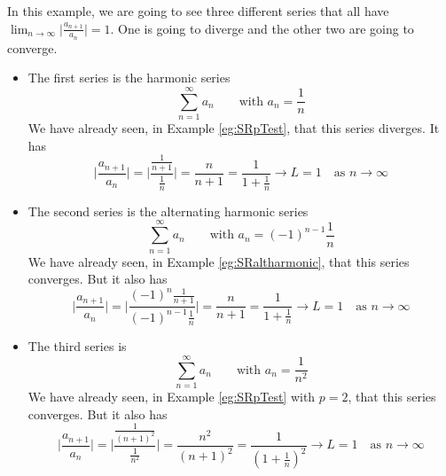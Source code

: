 \begin{eg}[$L=1$]\label{eg:SRratioC}
In this example, we are going to see three different series that all have
$\lim_{n\rightarrow\infty}\Big|\frac{a_{n+1}}{a_n}\Big| = 1$. One
is going to diverge and the other two are going to converge.

\begin{itemize}
\item
The first series is the harmonic series
\begin{equation*}
\sum_{n=1}^\infty a_n\qquad\text{with }a_n = \frac{1}{n}
\end{equation*}
We have already seen, in Example \ref{eg:SRpTest}, that this series diverges.
It has
\begin{equation*}
\Big|\frac{a_{n+1}}{a_n}\Big|
= \bigg|\frac{\frac{1}{n+1}}{\frac{1}{n}}\bigg|
 = \frac{n}{n+1}
 = \frac{1}{1+\frac{1}{n}}
\rightarrow L=1\quad\text{as $n\rightarrow\infty$}
\end{equation*}

\item
The second series is the alternating harmonic series
\begin{equation*}
\sum_{n=1}^\infty a_n\qquad\text{with }a_n = (-1)^{n-1}\frac{1}{n}
\end{equation*}
We have already seen, in Example \ref{eg:SRaltharmonic}, that this series converges.
But it also has
\begin{equation*}
\Big|\frac{a_{n+1}}{a_n}\Big|
= \bigg|\frac{(-1)^n\frac{1}{n+1}}{(-1)^{n-1}\frac{1}{n}}\bigg|
 = \frac{n}{n+1}
 = \frac{1}{1+\frac{1}{n}}
\rightarrow L=1\quad\text{as $n\rightarrow\infty$}
\end{equation*}

\item
The third series is
\begin{equation*}
\sum_{n=1}^\infty a_n\qquad\text{with }a_n = \frac{1}{n^2}
\end{equation*}
We have already seen, in Example \ref{eg:SRpTest} with $p=2$,
that this series converges. But it also has
\begin{equation*}
\Big|\frac{a_{n+1}}{a_n}\Big|
= \bigg|\frac{\frac{1}{(n+1)^2}}{\frac{1}{n^2}}\bigg|
 = \frac{n^2}{(n+1)^2}
 = \frac{1}{(1+\frac{1}{n})^2}
\rightarrow L=1\quad\text{as $n\rightarrow\infty$}
\end{equation*}

\end{itemize}
\end{eg}

